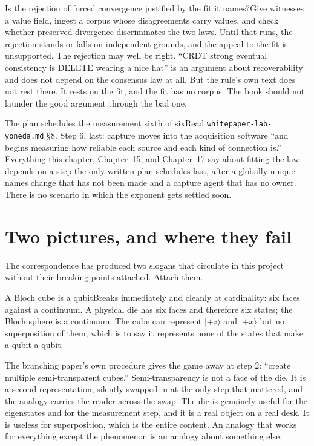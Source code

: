 \begin{Open}{Is the rejection of forced convergence justified by the fit it names?}{Give witnesses a value field, ingest a corpus whose disagreements carry values, and check whether preserved divergence discriminates the two laws.}
Until that runs, the rejection stands or falls on independent grounds, and the appeal to the fit is unsupported.
The rejection may well be right. ``CRDT strong eventual consistency is DELETE wearing a nice hat'' is an argument about recoverability and does not depend on the consensus law at all. But the rule's own text does not rest there. It rests on the fit, and the fit has no corpus. The book should not launder the good argument through the bad one.
\end{Open}

\begin{Correspondence}{The plan schedules the measurement sixth of six}{Read \texttt{whitepaper-lab-yoneda.md} \S8. Step 6, last: capture moves into the acquisition software ``and begins measuring how reliable each source and each kind of connection is.''}
Everything this chapter, Chapter~15, and Chapter~17 say about fitting the law depends on a step the only written plan schedules last, after a globally-unique-names change that has not been made and a capture agent that has no owner. There is no scenario in which the exponent gets settled soon.
\end{Correspondence}

\section{Two pictures, and where they fail}

The correspondence has produced two slogans that circulate in this project without their breaking points attached. Attach them.

\begin{Analogy}{A Bloch cube is a qubit}{Breaks immediately and cleanly at cardinality: six faces against a continuum.}
A physical die has six faces and therefore six states; the Bloch sphere is a continuum. The cube can represent $|{+}z\rangle$ and $|{+}x\rangle$ but no superposition of them, which is to say it represents none of the states that make a qubit a qubit.

The branching paper's own procedure gives the game away at step 2: ``create multiple semi-transparent cubes.'' Semi-transparency is not a face of the die. It is a second representation, silently swapped in at the only step that mattered, and the analogy carries the reader across the swap.
The die is genuinely useful for the eigenstates and for the measurement step, and it is a real object on a real desk. It is useless for superposition, which is the entire content. An analogy that works for everything except the phenomenon is an analogy about something else.
\end{Analogy}

